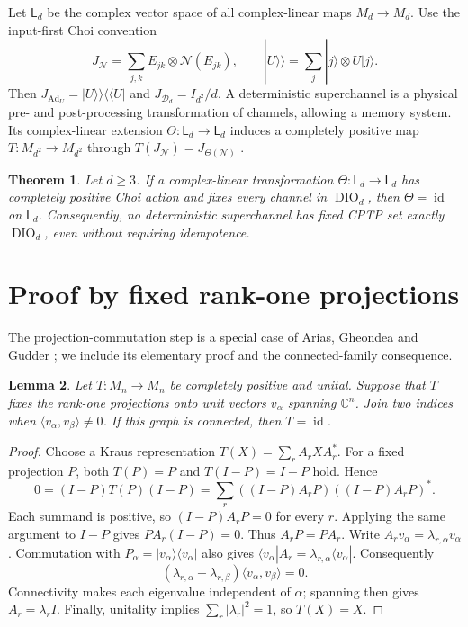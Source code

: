 \documentclass[11pt]{article}
\newtheorem{theorem}{Theorem}
\newtheorem{lemma}[theorem]{Lemma}
\newcommand{\DIO}{\operatorname{DIO}}
\newcommand{\Ad}{\operatorname{Ad}}
\newcommand{\id}{\operatorname{id}}
\begin{document}
Let $\mathsf L_d$ be the complex vector space of all complex-linear maps
$M_d\to M_d$. Use the input-first Choi convention
\[
 J_{\mathcal N}=\sum_{j,k}E_{jk}\otimes\mathcal N(E_{jk}),\qquad
 |U\rangle\!\rangle=\sum_j|j\rangle\otimes U|j\rangle.
\]
Then $J_{\Ad_U}=|U\rangle\!\rangle\langle\!\langle U|$ and
$J_{\mathcal D_d}=I_{d^2}/d$. A deterministic superchannel is a physical
pre- and post-processing transformation of channels, allowing a memory
system. Its complex-linear extension $\Theta:\mathsf L_d\to\mathsf L_d$
induces a completely positive map $T:M_{d^2}\to M_{d^2}$ through
$T(J_{\mathcal N})=J_{\Theta(\mathcal N)}$
\cite[pp.~2--3, Eqs.~(6)--(7) and Theorem~1]{CDP}.

\begin{theorem}\label{thm:rigidity}
Let $d\geq3$. If a complex-linear transformation
$\Theta:\mathsf L_d\to\mathsf L_d$ has completely positive Choi action
and fixes every channel in $\DIO_d$, then $\Theta=\id$ on $\mathsf L_d$.
Consequently, no deterministic superchannel has fixed CPTP set exactly
$\DIO_d$, even without requiring idempotence.
\end{theorem}

\section{Proof by fixed rank-one projections}
The projection-commutation step is a special case of
Arias, Gheondea and Gudder \cite[Corollary~3.4]{AGG}; we include its
elementary proof and the connected-family consequence.
\begin{lemma}\label{lem:rigidity}
Let $T:M_n\to M_n$ be completely positive and unital. Suppose that $T$
fixes the rank-one projections onto unit vectors $v_\alpha$ spanning
$\mathbb C^n$. Join two indices when
$\langle v_\alpha,v_\beta\rangle\ne0$. If this graph is connected, then
$T=\id$.
\end{lemma}
\begin{proof}
Choose a Kraus representation $T(X)=\sum_r A_rXA_r^*$.
For a fixed projection $P$, both $T(P)=P$ and $T(I-P)=I-P$ hold. Hence
\[
 0=(I-P)T(P)(I-P)
   =\sum_r ((I-P)A_rP)((I-P)A_rP)^*.
\]
Each summand is positive, so $(I-P)A_rP=0$ for every $r$.
Applying the same argument to $I-P$ gives $PA_r(I-P)=0$.
Thus $A_rP=PA_r$. Write $A_rv_\alpha=\lambda_{r,\alpha}v_\alpha$.
Commutation with $P_\alpha=|v_\alpha\rangle\langle v_\alpha|$ also gives
$\langle v_\alpha|A_r=\lambda_{r,\alpha}\langle v_\alpha|$.
Consequently
\[
 (\lambda_{r,\alpha}-\lambda_{r,\beta})
       \langle v_\alpha,v_\beta\rangle=0.
\]
Connectivity makes each eigenvalue independent of $\alpha$; spanning then
gives $A_r=\lambda_r I$. Finally, unitality implies
$\sum_r|\lambda_r|^2=1$, so $T(X)=X$.
\end{proof}
\end{document}
